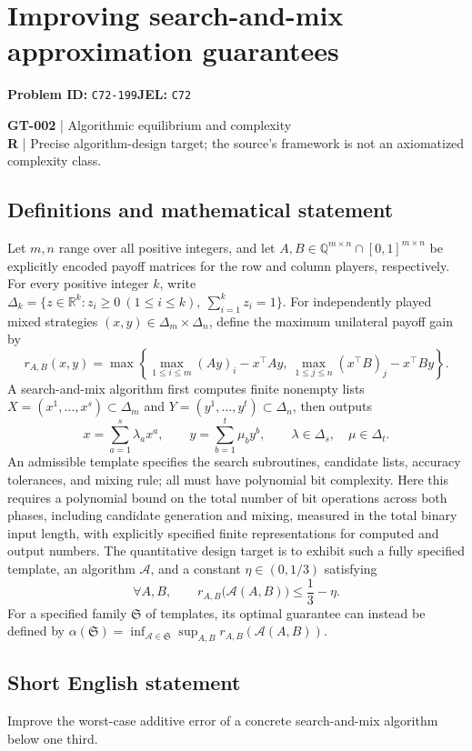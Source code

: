 \documentclass[11pt,a4paper]{article}
\newcommand{\R}{\mathbb R}
\begin{document}
\section*{Improving search-and-mix approximation guarantees}
\textbf{Problem ID:} \texttt{C72-199}\quad \textbf{JEL:} \texttt{C72}\par
\label{problem:OP-0132}
\label{game:GT-002}
{\sffamily\small\color{muted}
\textbf{GT-002} | Algorithmic equilibrium and complexity\\
\textbf{R} | Precise algorithm-design target; the source's framework is not an axiomatized complexity class.
\par}
\subsection*{Definitions and mathematical statement}
Let $m,n$ range over all positive integers, and let $A,B\in\mathbb Q^{m\times n}\cap[0,1]^{m\times n}$ be explicitly encoded payoff matrices for the row and column players, respectively. For every positive integer $k$, write $\Delta_k=\{z\in\R^k:z_i\geq0\ (1\leq i\leq k),\ \sum_{i=1}^k z_i=1\}$. For independently played mixed strategies $(x,y)\in\Delta_m\times\Delta_n$, define the maximum unilateral payoff gain by
\[
 r_{A,B}(x,y)=\max\left\{\max_{1\leq i\leq m}(Ay)_i-x^\top Ay,\ \max_{1\leq j\leq n}(x^\top B)_j-x^\top By\right\}.
\]
A search-and-mix algorithm first computes finite nonempty lists $X=(x^1,\ldots,x^s)\subset\Delta_m$ and $Y=(y^1,\ldots,y^t)\subset\Delta_n$, then outputs
\[
 x=\sum_{a=1}^{s}\lambda_ax^a,\qquad
 y=\sum_{b=1}^{t}\mu_by^b,\qquad
 \lambda\in\Delta_s,\quad\mu\in\Delta_t.
\]
An admissible template specifies the search subroutines, candidate lists, accuracy tolerances, and mixing rule; all must have polynomial bit complexity. Here this requires a polynomial bound on the total number of bit operations across both phases, including candidate generation and mixing, measured in the total binary input length, with explicitly specified finite representations for computed and output numbers. The quantitative design target is to exhibit such a fully specified template, an algorithm $\mathcal A$, and a constant $\eta\in(0,1/3)$ satisfying
\[
 \forall A,B,\qquad
 r_{A,B}\bigl(\mathcal A(A,B)\bigr)\leq \frac13-\eta.
\]
For a specified family $\mathfrak S$ of templates, its optimal guarantee can instead be defined by $\alpha(\mathfrak S)=\inf_{\mathcal A\in\mathfrak S}\sup_{A,B}r_{A,B}(\mathcal A(A,B))$.
\subsection*{Short English statement}
Improve the worst-case additive error of a concrete search-and-mix algorithm below one third.
\end{document}
